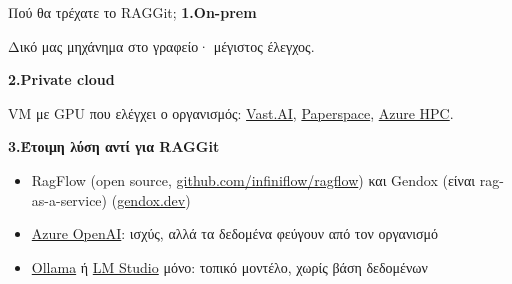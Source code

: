 \documentclass[aspectratio=169,11pt]{beamer}
\begin{document}
\begin{frame}{Πού θα τρέχατε το RAGGit;}
  \setlength{\parskip}{0pt}
  \vspace{2mm}
  {\large\bfseries 1.\enspace On-prem}\par
  \small Δικό μας μηχάνημα στο γραφείο· μέγιστος έλεγχος.\par
  \vspace{3.5mm}
  {\large\bfseries 2.\enspace Private cloud}\par
  \small VM με GPU που ελέγχει ο οργανισμός:
  \href{https://vast.ai/}{Vast.AI},
  \href{https://www.paperspace.com/machines}{Paperspace},
  \href{https://learn.microsoft.com/en-us/azure/architecture/guide/compute/high-performance-computing}{Azure HPC}.\par
  \vspace{3.5mm}
  {\large\bfseries 3.\enspace Έτοιμη λύση αντί για RAGGit}\par
  \begin{itemize}
    \item \small RagFlow (open source,
      \href{https://github.com/infiniflow/ragflow}%
      {github.com/infiniflow/ragflow}) και Gendox (είναι rag-as-a-service)
      (\href{https://gendox.dev/}{gendox.dev})
    \item \small
      \href{https://azure.microsoft.com/products/ai-services/ai-foundry}{Azure
      OpenAI}: ισχύς, αλλά τα δεδομένα φεύγουν από τον οργανισμό
    \item \small \href{https://ollama.com/}{Ollama} ή
      \href{https://lmstudio.ai/}{LM Studio} μόνο: τοπικό μοντέλο, χωρίς βάση δεδομένων
  \end{itemize}


\end{frame}
\end{document}
